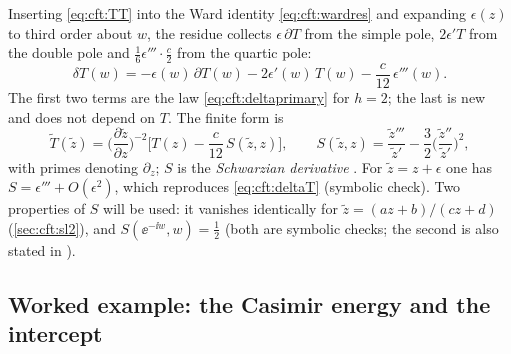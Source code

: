 Inserting \eqref{eq:cft:TT} into the Ward identity \eqref{eq:cft:wardres} and expanding
$\epsilon(z)$ to third order about $w$, the residue collects $\epsilon\,\partial T$ from the simple
pole, $2\epsilon'T$ from the double pole and $\frac16\epsilon'''\cdot\frac c2$ from the quartic
pole:
\begin{equation}\label{eq:cft:deltaT}
  \delta T(w)=-\epsilon(w)\,\partial T(w)-2\epsilon'(w)\,T(w)-\frac{c}{12}\,\epsilon'''(w).
\end{equation}
The first two terms are the law \eqref{eq:cft:deltaprimary} for $h=2$; the last is new and does
not depend on $T$. The finite form is
\begin{equation}\label{eq:cft:schwarzian}
  \tilde T(\tilde z)=\Big(\frac{\partial\tilde z}{\partial z}\Big)^{-2}
   \Big[T(z)-\frac{c}{12}\,S(\tilde z,z)\Big],\qquad
  S(\tilde z,z)=\frac{\tilde z'''}{\tilde z'}-\frac32\Big(\frac{\tilde z''}{\tilde z'}\Big)^2 ,
\end{equation}
with primes denoting $\partial_z$; $S$ is the \emph{Schwarzian derivative} . For $\tilde z=z+\epsilon$ one has
$S=\epsilon'''+O(\epsilon^2)$, which reproduces \eqref{eq:cft:deltaT} (symbolic check). Two
properties of $S$ will be used: it vanishes identically for $\tilde z=(az+b)/(cz+d)$
(\cref{sec:cft:sl2}), and $S(\ee^{-\ii w},w)=\tfrac12$ (both are symbolic checks; the second is
also stated in ).

\subsection{Worked example: the Casimir energy and the intercept}

